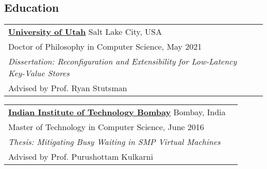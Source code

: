 \documentclass[margin,line]{res}
\begin{document}
\name{Chinmay Kulkarni (www.chinmayk.net) %
}
\begin{resume}


\section{\sc Education}
 \begin{tabular}{@{}p{5.5in}p{4in}}
 {\bf \href{http://www.cs.utah.edu/}{University of Utah}} \dotfill Salt Lake City,
  USA \\
 {\small Doctor of Philosophy in Computer Science, May 2021} \\
 {\small \emph{Dissertation: Reconfiguration and Extensibility for Low-Latency Key-Value Stores}} \\
 {\small Advised by Prof. Ryan Stutsman}
 \end{tabular}

 \vspace{-7pt}
 \begin{tabular}{@{}p{5.5in}p{4in}}
 {\bf \href{http://www.cse.iitb.ac.in/}{Indian Institute of
 Technology Bombay}} \dotfill Bombay, India
 \\ {\small Master of Technology in Computer Science, June 2016} \\
 {\small \emph{Thesis: Mitigating Busy Waiting in SMP Virtual Machines}}\\
 {\small Advised by Prof. Purushottam Kulkarni}
 \end{tabular}


\end{resume}
\end{document}
